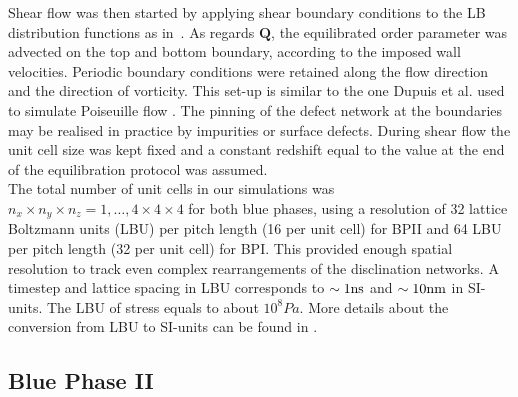\documentclass[12pt,twoside]{iopart}
\begin{document}
Shear flow was then started by applying shear boundary conditions to the LB distribution functions as in~\cite{Denniston:2004}. As regards ${\mathbf Q}$, the equilibrated order parameter was advected on the top and bottom boundary, according to the imposed wall velocities. Periodic boundary conditions were retained along the flow direction and the direction of vorticity.
This set-up is similar to the one Dupuis et al. used to simulate Poiseuille flow \cite{Dupuis:2005}. The pinning of the defect network at the boundaries may be realised in practice by impurities or surface defects.
During shear flow the unit cell size was kept fixed and a constant redshift equal to the value at the end of the equilibration protocol was assumed.\\ 
The total number of unit cells in our simulations was $n_x\times n_y \times n_z= 1, \dots, 4 \times 4 \times 4$ for both blue phases, using a resolution of 32 lattice Boltzmann units (LBU) per pitch length (16 per unit cell) for BPII and 64 LBU per pitch length (32 per unit cell) for BPI.  
This provided enough spatial resolution to track even complex rearrangements of the disclination networks.
A timestep and lattice spacing in LBU corresponds to $\sim 1 {\rm ns}$ and $\sim 10{\rm nm}$ in SI-units.
The LBU of stress equals to about $10^8 Pa$. 
More details about the conversion from LBU to SI-units can be found in \cite{Henrich:2010b,Henrich:2011a}.

\subsection{Blue Phase II}\label{sec_bpii}
\end{document}
